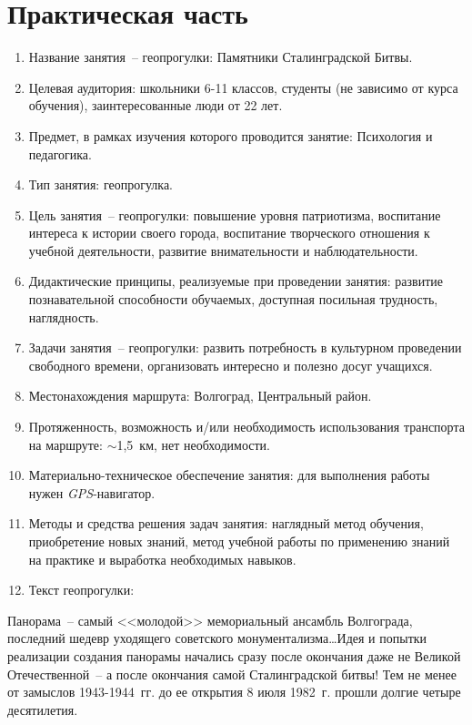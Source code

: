 \section*{Практическая часть}
\begin{enumerate}
  \item Название занятия~-- геопрогулки: Памятники Сталинградской Битвы.
  \item Целевая аудитория: школьники 6-11 классов, студенты (не зависимо от
    курса обучения), заинтересованные люди от 22 лет.
  \item Предмет, в рамках изучения которого проводится занятие: Психология и
    педагогика.
  \item Тип занятия: геопрогулка.
  \item Цель занятия~-- геопрогулки: повышение уровня патриотизма, воспитание
    интереса к истории своего города, воспитание творческого отношения к учебной
    деятельности, развитие внимательности и наблюдательности.
  \item Дидактические принципы, реализуемые при проведении занятия: развитие
    познавательной способности обучаемых, доступная посильная трудность,
    наглядность.
  \item Задачи занятия~-- геопрогулки: развить потребность в культурном
    проведении свободного времени, организовать интересно и полезно досуг
    учащихся.
  \item Местонахождения маршрута: Волгоград, Центральный район.
  \item Протяженность, возможность и/или необходимость использования транспорта
    на маршруте: \( \sim \)1,5~км, нет необходимости.
  \item Материально-техническое обеспечение занятия: для выполнения работы нужен
    \emph{GPS}-навигатор.
  \item Методы и средства решения задач занятия: наглядный метод обучения,
    приобретение новых знаний, метод учебной работы по применению знаний на
    практике и выработка необходимых навыков.
  \item Текст геопрогулки:
\end{enumerate}
  
Панорама~-- самый <<молодой>> мемориальный ансамбль Волгограда, последний
шедевр уходящего советского монументализма\ldots Идея и попытки реализации
создания панорамы начались сразу после окончания даже не Великой
Отечественной~-- а после окончания самой Сталинградской битвы! Тем не менее от
замыслов 1943-1944~гг. до ее открытия 8 июля 1982~г. прошли долгие четыре
десятилетия.

